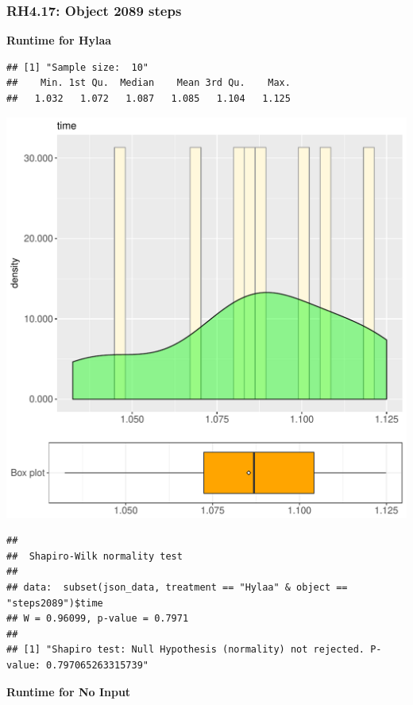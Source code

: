\documentclass{article}\usepackage[]{graphicx}\usepackage[]{color}
\makeatletter
\def\maxwidth{ %
  \ifdim\Gin@nat@width>\linewidth
    \linewidth
  \else
    \Gin@nat@width
  \fi
}
\newenvironment{kframe}{%
 \def\at@end@of@kframe{}%
 \ifinner\ifhmode%
  \def\at@end@of@kframe{\end{minipage}}%
  \begin{minipage}{\columnwidth}%
 \fi\fi%
 \def\FrameCommand##1{\hskip\@totalleftmargin \hskip-\fboxsep
 \colorbox{shadecolor}{##1}\hskip-\fboxsep
     \hskip-\linewidth \hskip-\@totalleftmargin \hskip\columnwidth}%
 \MakeFramed {\advance\hsize-\width
   \@totalleftmargin\z@ \linewidth\hsize
   \@setminipage}}%
 {\par\unskip\endMakeFramed%
 \at@end@of@kframe}
\newenvironment{knitrout}{}{} %
\makeatother
\begin{document}
\subsubsection{RH4.17: Object 2089 steps}

 \textbf{Runtime for Hylaa}
\begin{knitrout}
\color{fgcolor}\begin{kframe}
\begin{verbatim}
## [1] "Sample size:  10"
##    Min. 1st Qu.  Median    Mean 3rd Qu.    Max. 
##   1.032   1.072   1.087   1.085   1.104   1.125
\end{verbatim}
\end{kframe}
\includegraphics[width=\maxwidth]{figure/RH4_Hylaa_steps2089-1} 
\begin{kframe}\begin{verbatim}
## 
## 	Shapiro-Wilk normality test
## 
## data:  subset(json_data, treatment == "Hylaa" & object == "steps2089")$time
## W = 0.96099, p-value = 0.7971
## 
## [1] "Shapiro test: Null Hypothesis (normality) not rejected. P-value: 0.797065263315739"
\end{verbatim}
\end{kframe}
\end{knitrout}
 \textbf{Runtime for No Input}
\end{document}
